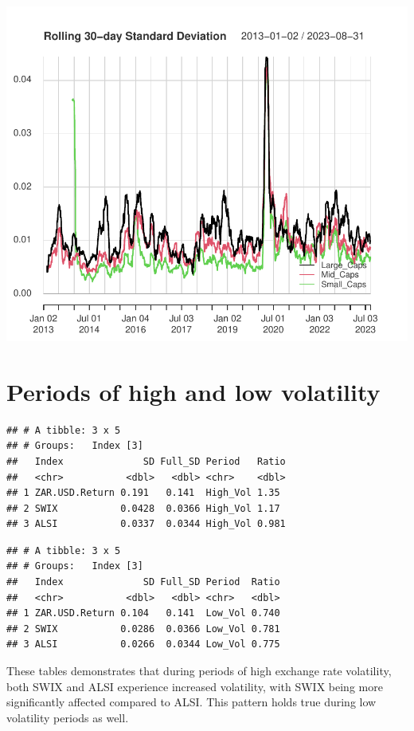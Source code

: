 \documentclass[11pt,preprint, authoryear]{elsarticle}
\numberwithin{equation}{section}
\numberwithin{figure}{section}
\numberwithin{table}{section}
\begin{document}
\includegraphics{Question-3_files/figure-latex/unnamed-chunk-4-1.pdf}

\hypertarget{periods-of-high-and-low-volatility}{%
\section{Periods of high and low
volatility}\label{periods-of-high-and-low-volatility}}

\begin{verbatim}
## # A tibble: 3 x 5
## # Groups:   Index [3]
##   Index              SD Full_SD Period   Ratio
##   <chr>           <dbl>   <dbl> <chr>    <dbl>
## 1 ZAR.USD.Return 0.191   0.141  High_Vol 1.35 
## 2 SWIX           0.0428  0.0366 High_Vol 1.17 
## 3 ALSI           0.0337  0.0344 High_Vol 0.981
\end{verbatim}

\begin{verbatim}
## # A tibble: 3 x 5
## # Groups:   Index [3]
##   Index              SD Full_SD Period  Ratio
##   <chr>           <dbl>   <dbl> <chr>   <dbl>
## 1 ZAR.USD.Return 0.104   0.141  Low_Vol 0.740
## 2 SWIX           0.0286  0.0366 Low_Vol 0.781
## 3 ALSI           0.0266  0.0344 Low_Vol 0.775
\end{verbatim}

These tables demonstrates that during periods of high exchange rate
volatility, both SWIX and ALSI experience increased volatility, with
SWIX being more significantly affected compared to ALSI. This pattern
holds true during low volatility periods as well.
\end{document}
